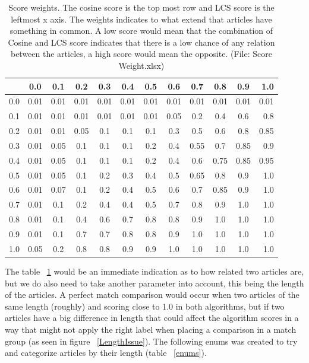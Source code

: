 \begin{table}
\begin{center}
	\begin{tabular}{l | c | c | c | c | c | c | c | c | c | c | r}
		    & 0.0 & 0.1 & 0.2 & 0.3 & 0.4 & 0.5 & 0.6 & 0.7 & 0.8 & 0.9 & 1.0\\ \hline
		0.0 & 0.01 & 0.01 & 0.01 & 0.01 & 0.01 & 0.01 & 0.01 & 0.01 & 0.01 & 0.01 & 0.01\\ \hline
		0.1 & 0.01 & 0.01 & 0.01 & 0.01 & 0.01 & 0.01 & 0.05 & 0.2 & 0.4 & 0.6 & 0.8\\ \hline
		0.2 & 0.01 & 0.01 & 0.05 & 0.1 & 0.1 & 0.1 & 0.3 & 0.5 & 0.6 & 0.8 & 0.85\\ \hline
		0.3 & 0.01 & 0.05 & 0.1 & 0.1 & 0.1 & 0.2 & 0.4 & 0.55 & 0.7 & 0.85 & 0.9\\ \hline
		0.4 & 0.01 & 0.05 & 0.1 & 0.1 & 0.1 & 0.2 & 0.4 & 0.6 & 0.75 & 0.85 & 0.95\\ \hline
		0.5 & 0.01 & 0.05 & 0.1 & 0.2 & 0.3 & 0.4 & 0.5 & 0.65 & 0.8 & 0.9 & 1.0\\ \hline
		0.6 & 0.01 & 0.07 & 0.1 & 0.2 & 0.4 & 0.5 & 0.6 & 0.7 & 0.85 & 0.9 & 1.0\\ \hline
		0.7 & 0.01 & 0.1 & 0.2 & 0.4 & 0.4 & 0.5 & 0.7 & 0.8 & 0.9 & 1.0 & 1.0\\ \hline
		0.8 & 0.01 & 0.1 & 0.4 & 0.6 & 0.7 & 0.8 & 0.8 & 0.9 & 1.0 & 1.0 & 1.0\\ \hline
		0.9 & 0.01 & 0.1 & 0.7 & 0.7 & 0.8 & 0.8 & 0.9 & 1.0 & 1.0 & 1.0 & 1.0\\ \hline
		1.0 & 0.05 & 0.2 & 0.8 & 0.8 & 0.9 & 0.9 & 1.0 & 1.0 & 1.0 & 1.0 & 1.0\\ \hline
	\end{tabular}
\end{center}
\caption{Score weights. The cosine score is the top most row and LCS score is the leftmost x axis. The weights indicates to what extend that articles have something in common. A low score would mean that the combination of Cosine and LCS score indicates that there is a low chance of any relation between the articles, a high score would mean the opposite. (File: Score Weight.xlsx)} \label{ScoreWeights}
\end{table}

The table ~\ref{ScoreWeights} would be an immediate indication as to how related two articles are, but we do also need to take another parameter into account, this being the length of the articles. A perfect match comparison would occur when two articles of the same length (roughly) and scoring close to 1.0 in both algorithms, but if two articles have a big difference in length that could affect the algorithm scores in a way that might not apply the right label when placing a comparison in a match group (as seen in figure ~\ref{LengthIssue}). The following enums was created to try and categorize articles by their length (table ~\ref{enums}).

